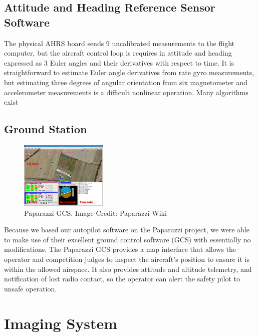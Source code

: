\documentclass[pdftex,10pt,letter]{article}
\begin{document}
\subsection{Attitude and Heading Reference Sensor Software}

The physical AHRS board sends 9 uncalibrated measurements to the flight computer, but the aircraft control loop is requires in attitude and heading expressed as 3 Euler angles \cite{euler_angles} and their derivatives with respect to time. It is straightforward to estimate Euler angle derivatives from rate gyro measurements, but estimating three degrees of angular orientation from six magnetometer and accelerometer measurements is a difficult nonlinear operation. Many algorithms exist 

\subsection{Ground Station}

\begin{figure}
	\vspace{-20pt}
	\centering
	\includegraphics[width=0.37\textwidth]{../images/paparazzi_gcs.jpg}
	\caption{Paparazzi GCS. Image Credit: Paparazzi Wiki \cite{paparazziweb }}
	\label{fig:paparazzi_gcs}
	\vspace{-60pt}
\end{figure}
Because we based our autopilot software on the Paparazzi project, we were able to make use of their excellent ground control software (GCS) with essentially no modifications. The Paparazzi GCS provides a map interface that allows the operator and competition judges to inspect the aircraft's position to ensure it is within the allowed airspace. It also provides attitude and altitude telemetry, and notification of lost radio contact, so the operator can alert the safety pilot to unsafe operation.

\section{Imaging System}
\end{document}

